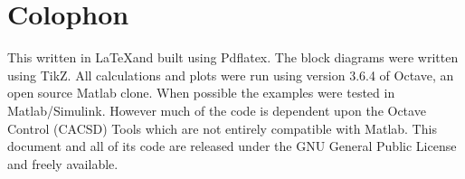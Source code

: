 \documentclass{article}
\begin{document}

\clearpage
\section{Colophon}
\label{app:colophon}

This written in \LaTeX and built using Pdflatex.
The block diagrams were written using TikZ\autocite{tikz}.
All calculations and plots were run using version 3.6.4 of
Octave\autocite{octave}, an open source Matlab clone.
When possible the examples were tested in Matlab/Simulink.
However much of the code is dependent upon the
Octave Control (CACSD) Tools\autocite{octave-control} which are
not entirely compatible with Matlab.
This document and all of its code are released under the
GNU General Public License and freely
available\autocite{github_jmahler_idle-control}.
\nocite{github_jmahler_control}


\clearpage
\printbibliography[heading=bibintoc]
\end{document}
